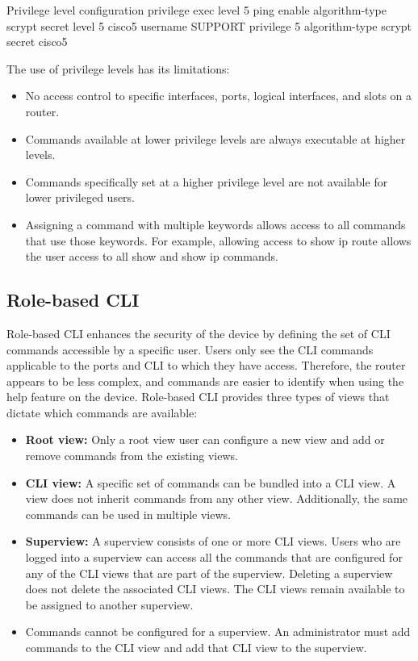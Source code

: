 \begin{sexylisting}{Privilege level configuration}
privilege exec level 5 ping 
enable algorithm-type scrypt secret level 5 cisco5
username SUPPORT privilege 5 algorithm-type scrypt secret cisco5
\end{sexylisting}

The use of privilege levels has its limitations:

\begin{itemize}
\item No access control to specific interfaces, ports, logical interfaces, and slots on a router.
\item Commands available at lower privilege levels are always executable at higher levels.
\item Commands specifically set at a higher privilege level are not available for lower privileged users.
\item Assigning a command with multiple keywords allows access to all commands that use those keywords. For example, allowing access to show ip route allows the user access to all show and show ip commands.
\end{itemize}

\subsection{Role-based CLI}

Role-based CLI enhances the security of the device by defining the set of CLI commands accessible by a specific user. Users only see the CLI commands applicable to the ports and CLI to which they have access. Therefore, the router appears to be less complex, and commands are easier to identify when using the help feature on the device. Role-based CLI provides three types of views that dictate which commands are available:

\begin{itemize}
\item \textbf{Root view:} Only a root view user can configure a new view and add or remove commands from the existing views.
\item \textbf{CLI view:} A specific set of commands can be bundled into a CLI view.  A view does not inherit commands from any other view. Additionally, the same commands can be used in multiple views.
\item \textbf{Superview:} A superview consists of one or more CLI views. Users who are logged into a superview can access all the commands that are configured for any of the CLI views that are part of the superview. Deleting a superview does not delete the associated CLI views. The CLI views remain available to be assigned to another superview.
\item \note Commands cannot be configured for a superview. An administrator must add commands to the CLI view and add that CLI view to the superview.
\end{itemize}

